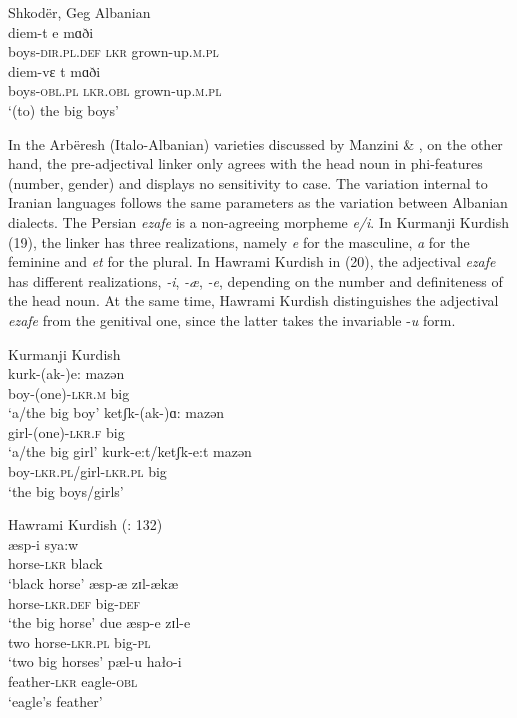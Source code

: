 \documentclass[output=paper]{langsci/langscibook}
\begin{document}
\ea%
    Shkodër, Geg Albanian\label{ex:manzini:18}\\
    \ea
    \gll diem-t     e   mɑði     \\
         boys-\textsc{dir.pl.def}  \textsc{lkr}  grown-up.\textsc{m.pl}  \\
    \ex
    \gll diem-vɛ    t     mɑði \\
         boys-\textsc{obl.pl}     \textsc{lkr.obl}  grown-up.\textsc{m.pl}\\
    \glt ‘(to) the big boys’  
    \z
\z

In the Arbëresh (Italo-Albanian) varieties discussed by Manzini \& \citet{Savoia2011a}, on the other hand, the pre-adjectival linker only agrees with the head noun in phi-features (number, gender) and displays no sensitivity to case. The variation internal to Iranian languages follows the same parameters as the variation between Albanian dialects. The Persian \textit{ezafe} is a non-agreeing morpheme \textit{e/i}. In Kurmanji Kurdish (19), the linker has three realizations, namely \textit{e} for the masculine, \textit{a} for the feminine and \textit{et} for the plural. In Hawrami Kurdish in (20), the adjectival \textit{ezafe} has different realizations, \textit{{}-i}, \textit{{}-æ}, \textit{{}-e}, depending on the number and definiteness of the head noun. At the same time, Hawrami Kurdish distinguishes the adjectival \textit{ezafe} from the genitival one, since the latter takes the invariable -\textit{u} form.

\ea%
    Kurmanji Kurdish \citep{FrancoEtAl2015}\label{ex:manzini:19}\\
    \ea
    \gll kurk-(ak-)e:     mazən       \\
         boy-(one)-\textsc{lkr.m}    big     \\
    \glt ‘a/the big boy’
    \ex
    \gll ketʃk-(ak-)ɑ:    mazən      \\
         girl-(one)-\textsc{lkr.f}   big     \\
    \glt ‘a/the big girl’
    \ex
    \gll kurk-e:t/ketʃk-e:t     mazən     \\
         boy-\textsc{lkr.pl}/girl-\textsc{lkr.pl}  big   \\
    \glt ‘the big boys/girls’
    \z
\z


\ea%
    Hawrami Kurdish (\citealt{Holmberg2008}: 132)\label{ex:manzini:20}\\
    \ea
    \gll æsp-i     sya:w      \\
         horse-\textsc{lkr}  black\\
    \glt ‘black horse’
    \ex
    \gll æsp{}-æ     zɪl-ækæ\\
         horse-\textsc{lkr.def}  big-\textsc{def}\\
    \glt ‘the big horse’ 
    \ex
    \gll due   æsp-e    zɪl-e \\
         two   horse-\textsc{lkr.pl}  big-\textsc{pl} \\
    \glt ‘two big horses’
    \ex
    \gll pæl-u     hało-i\\
         feather-\textsc{lkr}   eagle-\textsc{obl}\\
    \glt ‘eagle’s feather’ 
    \z
\z        
\end{document}
